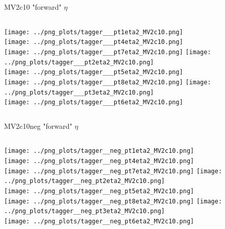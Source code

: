 \documentclass[pdflatex,8pt]{beamer}
\begin{document}
\begin{frame}{MV2c10 "forward" $\eta$}
  \begin{columns}[t]
    \centering
    \texttt{[image: ../png\_plots/tagger\_\_\_pt1eta2\_MV2c10.png]}\\
    \texttt{[image: ../png\_plots/tagger\_\_\_pt4eta2\_MV2c10.png]}\\
    \texttt{[image: ../png\_plots/tagger\_\_\_pt7eta2\_MV2c10.png]}
    \centering
    \texttt{[image: ../png\_plots/tagger\_\_\_pt2eta2\_MV2c10.png]}\\
    \texttt{[image: ../png\_plots/tagger\_\_\_pt5eta2\_MV2c10.png]}\\
    \texttt{[image: ../png\_plots/tagger\_\_\_pt8eta2\_MV2c10.png]}
    \centering
    \texttt{[image: ../png\_plots/tagger\_\_\_pt3eta2\_MV2c10.png]}\\
    \texttt{[image: ../png\_plots/tagger\_\_\_pt6eta2\_MV2c10.png]}
  \end{columns}
\end{frame}

\begin{frame}{MV2c10neg "forward" $\eta$}
  \begin{columns}[t]
    \centering
    \texttt{[image: ../png\_plots/tagger\_\_neg\_pt1eta2\_MV2c10.png]}\\
    \texttt{[image: ../png\_plots/tagger\_\_neg\_pt4eta2\_MV2c10.png]}\\
    \texttt{[image: ../png\_plots/tagger\_\_neg\_pt7eta2\_MV2c10.png]}
    \centering
    \texttt{[image: ../png\_plots/tagger\_\_neg\_pt2eta2\_MV2c10.png]}\\
    \texttt{[image: ../png\_plots/tagger\_\_neg\_pt5eta2\_MV2c10.png]}\\
    \texttt{[image: ../png\_plots/tagger\_\_neg\_pt8eta2\_MV2c10.png]}
    \centering
    \texttt{[image: ../png\_plots/tagger\_\_neg\_pt3eta2\_MV2c10.png]}\\
    \texttt{[image: ../png\_plots/tagger\_\_neg\_pt6eta2\_MV2c10.png]}
  \end{columns}
\end{frame}
\end{document}
